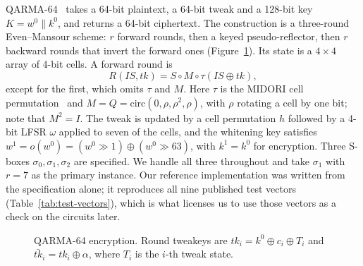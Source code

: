 \documentclass[runningheads,10pt]{llncs}
\begin{document}
QARMA-64~\cite{avanzi2017qarma} takes a 64-bit plaintext, a 64-bit tweak and a 128-bit key $K = w^0 \| k^0$, and returns a 64-bit ciphertext. The construction is a three-round Even--Mansour scheme: $r$ forward rounds, then a keyed pseudo-reflector, then $r$ backward rounds that invert the forward ones (Figure~\ref{fig:qarma-encryption}). Its state is a $4\times4$ array of 4-bit cells. A forward round is
\[
R(IS, tk) = S \circ M \circ \tau(IS \oplus tk),
\]
except for the first, which omits $\tau$ and $M$. Here $\tau$ is the MIDORI cell permutation~\cite{banik2015midori} and $M = Q = \mathrm{circ}(0,\rho,\rho^2,\rho)$, with $\rho$ rotating a cell by one bit; note that $M^2 = I$. The tweak is updated by a cell permutation $h$ followed by a 4-bit LFSR $\omega$ applied to seven of the cells, and the whitening key satisfies $w^1 = o(w^0) = (w^0 \gg 1) \oplus (w^0 \gg 63)$, with $k^1 = k^0$ for encryption. Three S-boxes $\sigma_0, \sigma_1, \sigma_2$ are specified. We handle all three throughout and take $\sigma_1$ with $r=7$ as the primary instance. Our reference implementation was written from the specification alone; it reproduces all nine published test vectors (Table~\ref{tab:test-vectors}), which is what licenses us to use those vectors as a check on the circuits later.

\begin{figure}[htbp]
\centering
{}
\caption{QARMA-64 encryption. Round tweakeys are $tk_i = k^0 \oplus c_i \oplus T_i$ and
$\bar{tk}_i = tk_i \oplus \alpha$, where $T_i$ is the $i$-th tweak state.}
\label{fig:qarma-encryption}
\end{figure}
\end{document}
